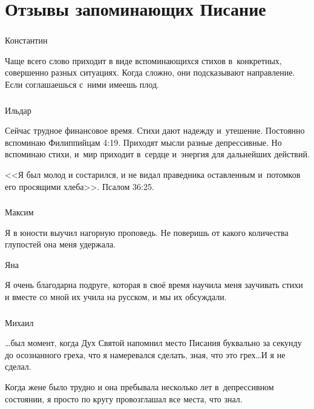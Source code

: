 \documentclass[t,aspectratio=169]{beamer} %
\def\hy#1{\parbox{\linewidth}{#1}} %
\begin{document}
\section{Отзывы запоминающих Писание}
\begin{frame}[c]
	\frametitle{\insertsection}
	\framesubtitle{\insertsubsection}

	\begin{block}{Константин}
		\hy{Чаще всего слово приходит в виде вспоминающихся стихов в~конкретных, совершенно разных ситуациях. Когда сложно, они подсказывают направление. Если соглашаешься с~ними имеешь плод.}
	\end{block}
	
\end{frame}
\begin{frame}[c]
	\frametitle{\insertsection}
	\framesubtitle{\insertsubsection}

	\begin{block}{Ильдар}
		\hy{Сейчас трудное финансовое время. Стихи дают надежду и~утешение. Постоянно вспоминаю Филиппийцам 4:19. Приходят мысли разные депрессивные. Но вспоминаю стихи, и~мир приходит в~сердце и~энергия для дальнейших действий.}
		
		\vspace{6pt}
		
		\hy{<<Я был молод и состарился, и не видал праведника оставленным и~потомков его просящими хлеба>>. Псалом 36:25.}
	\end{block}
\end{frame}
\begin{frame}[c]
	\frametitle{\insertsection}
	\framesubtitle{\insertsubsection}

	\begin{block}{Максим}
		\hy{Я в юности выучил нагорную проповедь. Не поверишь от какого количества глупостей она меня удержала.}
	\end{block}
	\begin{block}{Яна}
	\hy{Я очень благодарна подруге, которая в своё время научила меня заучивать стихи и вместе со мной их учила на русском, и мы их обсуждали.}
	\end{block}
\end{frame}%
\begin{frame}[c]
	\frametitle{\insertsection}
	\framesubtitle{\insertsubsection}

	\begin{block}{Михаил}
		\hy{\ldots был момент, когда Дух Святой напомнил место Писания буквально за секунду до осознанного греха, что я намеревался сделать, зная, что это грех\ldots И я не сделал.}

		\vspace{6pt}

		\hy{Когда жене было трудно и она пребывала несколько лет в~депрессивном состоянии, я просто по кругу провозглашал все места, что знал.}
	\end{block}

\end{frame}
\end{document}
